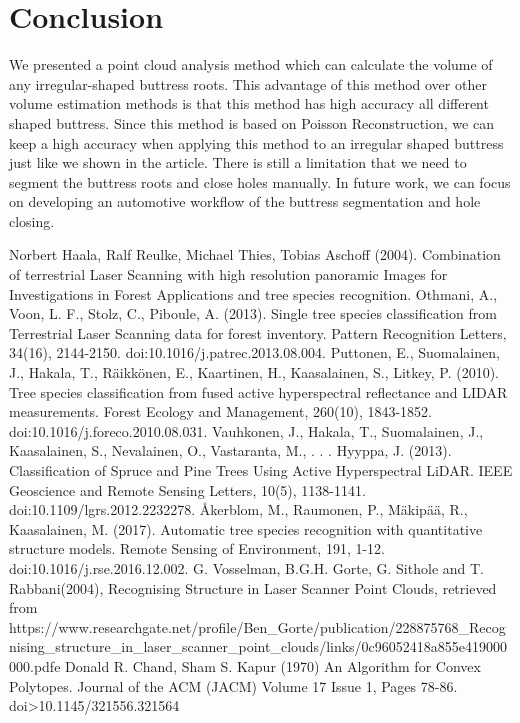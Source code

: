 \documentclass[runningheads,a4paper]{llncs}
\begin{document}
\section{Conclusion}
We presented a point cloud analysis method which can calculate the volume of any irregular-shaped buttress roots. This advantage of this method over other volume estimation methods is that this method has high accuracy all different shaped buttress. Since this method is based on Poisson Reconstruction, we can keep a high accuracy when applying this method to an irregular shaped buttress just like we shown in the article. There is still a limitation that we need to segment the buttress roots and close holes manually. In future work, we can focus on developing an automotive workflow of the buttress segmentation and hole closing.
\newpage
\begin{thebibliography}{4}
Norbert Haala, Ralf Reulke, Michael Thies, Tobias Aschoff (2004). Combination of terrestrial Laser Scanning with high resolution panoramic Images for Investigations in Forest Applications and tree species recognition.
Othmani, A., Voon, L. F., Stolz, C., Piboule, A. (2013). Single tree species classification from Terrestrial Laser Scanning data for forest inventory. Pattern Recognition Letters, 34(16), 2144-2150. doi:10.1016/j.patrec.2013.08.004.
Puttonen, E., Suomalainen, J., Hakala, T., Räikkönen, E., Kaartinen, H., Kaasalainen, S., Litkey, P. (2010). Tree species classification from fused active hyperspectral reflectance and LIDAR measurements. Forest Ecology and Management, 260(10), 1843-1852. doi:10.1016/j.foreco.2010.08.031.
Vauhkonen, J., Hakala, T., Suomalainen, J., Kaasalainen, S., Nevalainen, O., Vastaranta, M., . . . Hyyppa, J. (2013). Classification of Spruce and Pine Trees Using Active Hyperspectral LiDAR. IEEE Geoscience and Remote Sensing Letters, 10(5), 1138-1141. doi:10.1109/lgrs.2012.2232278.
Åkerblom, M., Raumonen, P., Mäkipää, R., Kaasalainen, M. (2017). Automatic tree species recognition with quantitative structure models. Remote Sensing of Environment, 191, 1-12. doi:10.1016/j.rse.2016.12.002.
G. Vosselman, B.G.H. Gorte, G. Sithole and T. Rabbani(2004), Recognising Structure in Laser Scanner Point Clouds, retrieved from https://www.researchgate.net/profile/Ben\_Gorte/publication/228875768\_Recognising\_structure\_in\_laser\_scanner\_point\_clouds/links/0c96052418a855e419000000.pdfe
Donald R. Chand, Sham S. Kapur (1970) An Algorithm for Convex Polytopes. Journal of the ACM (JACM) Volume 17 Issue 1, Pages 78-86. doi>10.1145/321556.321564

\end{thebibliography}
\end{document}
